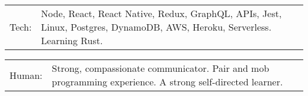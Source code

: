 \documentclass[10pt,a4paper]{article}
\newcommand{\tzlarrow}{(0,0) -- (0.2,0) -- (0.3,0.2) -- (0.2,0.4) -- (0,0.4) -- (0.1,0.2) -- cycle;}
\newcommand{\larrow}[1]
{\begin{tikzpicture}[scale=0.58]
	 \filldraw[fill=#1!100,draw=#1!100!black]  \tzlarrow
 \end{tikzpicture}
}
\newcommand{\metasection}[2]
{
\begin{tabular*}{1\textwidth}{p{2.4cm} p{14cm}}
\larrow{bgcol}	\normalsize{\textcolor{sectcol}{#1}}&#2\\[12pt]
\end{tabular*}
}
\begin{document}
\pagestyle{fancy}	


\vspace{-20.55pt}


\hspace{-0.25\linewidth}\colorbox{bgcol}{}



\vspace{12pt}

\metasection{Tech:}{Node, React, React Native, Redux, GraphQL, APIs, Jest, Linux, Postgres, DynamoDB, AWS, Heroku, Serverless. Learning Rust.}
\metasection{Human:}{Strong, compassionate communicator. Pair and mob programming experience. A strong self-directed learner.}

\vspace{6pt}

\end{document}
